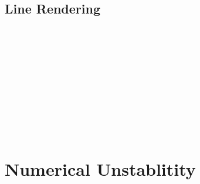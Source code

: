 \documentclass[12pt]{book}
\begin{document}
\subsection{Line Rendering}
\inputminted{python}{rendering/line_render/fun_shapes.py}
\inputminted{python}{rendering/line_render/moire.py}
\inputminted{python}{rendering/line_render/renderable.py}
\inputminted{python}{rendering/line_render/occlusion.py}
\inputminted{python}{rendering/line_render/render.py}
\inputminted{python}{rendering/line_render/line.py}
\inputminted{python}{rendering/line_render/polygon.py}
\inputminted{python}{rendering/line_render/polyhedron.py}
\inputminted{python}{rendering/line_render/container.py}
\inputminted{python}{rendering/line_render/error_handling.py}
\inputminted{python}{rendering/line_render/point.py}
\inputminted{python}{rendering/line_render/camera.py}
\inputminted{python}{rendering/line_render/shapes3d.py}
\inputminted{python}{rendering/line_render/swiss_polygon.py}

\section{Numerical Unstablitity}
\end{document}

